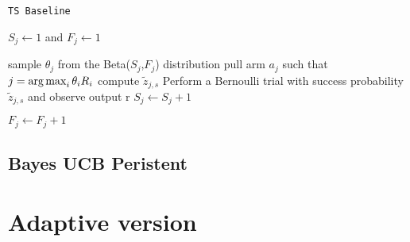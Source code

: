 \begin{algorithm}[H]
	\caption{\texttt{TS Baseline}}
	\begin{scriptsize}
		\begin{algorithmic}[1]
			
			
			
			
			
			 
				\State $S_j \gets 1$ and $F_j \gets 1$
			\EndFor
			
			  
				\State sample $\theta_j$ from the Beta($S_j$,$F_j$) distribution
				\EndFor
			\State pull arm $a_j$ such that $j = \operatorname*{arg\,max}_i \theta_iR_i$
			 
				\State compute $\tilde{z}_{j,s}$
				\State Perform a Bernoulli trial with success probability $\tilde{z}_{j,s}$ and observe output r
				 \;
				\State $S_j \gets S_j + 1$ \;
				
				\Else
				\State $F_j \gets F_j + 1$ \;
				
				\EndIf
				\EndIf		
			\EndFor
			
			\EndFor
			\EndFor
			
			
			\EndFunction
			
		\end{algorithmic}
	\end{scriptsize}
	\label{alg:TSBASELINE}
\end{algorithm}

\subsection{Bayes UCB Peristent}



\section{Adaptive version}























































